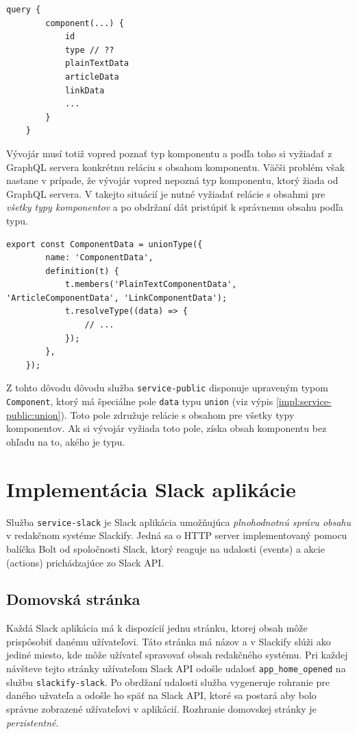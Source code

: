 \begin{lstlisting}[caption={Príklad získania obsahu komponentu pred optimalizáciou.}]
	query {
		component(...) {
			id
			type // ??
			plainTextData
			articleData
			linkData
			...
		}
	}
\end{lstlisting}

\medskip

\noindent Vývojár musí totiž vopred poznať typ komponentu a podľa toho si vyžiadať z GraphQL servera konkrétnu reláciu s obsahom komponentu. Väčši problém však nastane v prípade, že vývojár vopred nepozná typ komponentu, ktorý žiada od GraphQL servera. V takejto situácií je nutné vyžiadať relácie s obsahmi pre \emph{všetky typy komponentov} a po obdržaní dát pristúpiť k správnemu obsahu podľa typu. \\

\begin{lstlisting}[caption={Definícia union typu pre dáta komponenty.}, label={impl:service-public:union}]
	export const ComponentData = unionType({
		name: 'ComponentData',
		definition(t) {
			t.members('PlainTextComponentData', 'ArticleComponentData', 'LinkComponentData');
			t.resolveType((data) => {
				// ...
			});
		},
	});
\end{lstlisting}

\medskip

\noindent Z tohto dôvodu dôvodu služba \texttt{service-public} disponuje upraveným typom \texttt{Component}, ktorý má špeciálne pole \texttt{data} typu \texttt{union} (viz výpis \ref{impl:service-public:union}). Toto pole združuje relácie s obsahom pre všetky typy komponentov. Ak si vývojár vyžiada toto pole, získa obsah komponentu bez ohľadu na to, akého je typu.

\chapter{Implementácia Slack aplikácie}
Služba \texttt{service-slack} je Slack aplikácia umožňujúca \emph{plnohodnotnú správu obsahu} v redakčnom systéme Slackify. Jedná sa o HTTP server implementovaný pomocu balíčka Bolt od spoločnosti Slack, ktorý reaguje na udalosti (events) a akcie (actions) prichádzajúce zo Slack API.

\section{Domovská stránka}
Každá Slack aplikácia má k dispozícií jednu stránku, ktorej obsah môže prispôsobiť danému užívateľovi. Táto stránka má názov  a v Slackify slúži ako jediné miesto, kde môže užívateľ spravovať obsah redakčného systému. Pri každej návšteve tejto stránky užívateľom Slack API odošle udalosť \texttt{app\_home\_opened} na službu \texttt{slackify-slack}. Po obrdžaní udalosti služba vygeneruje rohranie pre daného užvateľa a odošle ho späť na Slack API, ktoré sa postará aby bolo správne zobrazené užívateľovi v aplikácií. Rozhranie domovskej stránky je \emph{perzistentné}. \\

